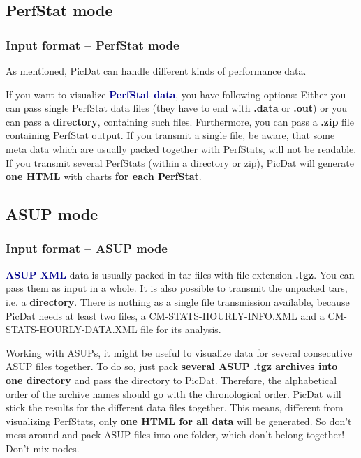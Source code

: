 \documentclass[8pt]{beamer}
\begin{document}
\subsection{PerfStat mode}
\begin{frame}
\frametitle{Input format -- PerfStat mode}
As mentioned, PicDat can handle different kinds of performance data.
\bigskip

If you want to visualize \textcolor{darkblue}{\textbf{PerfStat data}}, you have following options: Either you can pass single PerfStat data files (they have to end with \textbf{.data} or \textbf{.out}) or you can pass a \textbf{directory}, containing such files. Furthermore, you can pass a \textbf{.zip} file containing PerfStat output. If you transmit a single file, be aware, that some meta data which are usually packed together with PerfStats, will not be readable. If you transmit several PerfStats (within a directory or zip), PicDat will generate \textbf{one HTML} with charts \textbf{for each PerfStat}. 
\end{frame}

\subsection{ASUP mode}
\begin{frame}
\frametitle{Input format -- ASUP mode}
\textcolor{darkblue}{\textbf{ASUP XML}} data is usually packed in tar files with file extension \textbf{.tgz}. You can pass them as input in a whole. It is also possible to transmit the unpacked tars, i.e. a \textbf{directory}. There is nothing as a single file transmission available, because PicDat needs at least two files, a CM-STATS-HOURLY-INFO.XML and a CM-STATS-HOURLY-DATA.XML file for its analysis. 

Working with ASUPs, it might be useful to visualize data for several consecutive ASUP files together. To do so, just pack \textbf{several ASUP .tgz archives into one directory} and pass the directory to PicDat. Therefore, the alphabetical order of the archive names should go with the chronological order. PicDat will stick the results for the different data files together. This means, different from visualizing PerfStats, only \textbf{one HTML for all data} will be generated. So don't mess around and pack ASUP files into one folder, which don't belong together! Don't mix nodes.
\end{frame}
\end{document}
